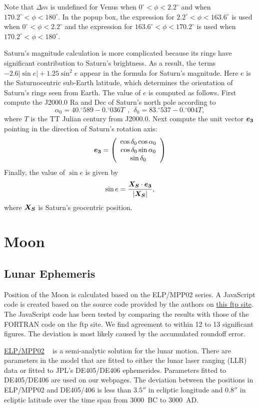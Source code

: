 \documentclass[12pt]{article}
\newcommand \beq {\begin{equation}}
\newcommand \eeq {\end{equation}}
\newcommand{\ve}[1]{\mbox{\boldmath $#1$}}
\begin{document}
Note that $\Delta m$ is undefined for Venus when $0^\circ < \phi < 2.2^\circ$ and 
when $170.2^\circ < \phi < 180^\circ$. In the popup box, the expression for 
$2.2^\circ < \phi < 163.6^\circ$ is used when $0^\circ < \phi < 2.2^\circ$ 
and the expression for $163.6^\circ < \phi < 170.2^\circ$ is used when 
$170.2^\circ < \phi < 180^\circ$.

Saturn's magnitude calculation is more complicated because its rings have 
significant contribution to Saturn's brightness. As a result, the terms 
$- 2.6 |\sin e| + 1.25\sin^2 e$ appear in the formula for Saturn's magnitude. 
Here $e$ is the Saturnocentric sub-Earth latitude, which determines the orientation 
of Saturn's rings seen from Earth. The value of $e$ is computed as follows.
First compute the J2000.0 Ra and Dec of Saturn's north pole according to 
\beq
  \alpha_0 = 40.^{\circ}589 - 0.^{\circ}036 T \ \ , \ \ 
  \delta_0 = 83.^{\circ}537 - 0.^{\circ}004 T ,
\eeq
where $T$ is the TT Julian century from J2000.0. Next compute the 
unit vector $\ve{e_3}$ pointing in the direction of Saturn's rotation axis:
\beq
\ve{e_3} = \left( \begin{array}{c} 
\cos \delta_0 \cos \alpha_0 \\ \cos \delta_0 \sin \alpha_0 \\ \sin \delta_0 
\end{array} \right) 
\label{eq:SaturnE3}
\eeq
Finally, the value of $\sin e$ is given by 
\beq
  \sin e = \frac{\ve{X_S}\cdot \ve{e_3}}{|\ve{X_S}|} ,
\eeq
where $\ve{X_S}$ is Saturn's geocentric position.

\section{Moon}

\subsection{Lunar Ephemeris}

Position of the Moon is calculated based on the ELP/MPP02 series. A JavaScript 
code is created based on the source code provided by the authors on 
\href{ftp://cyrano-se.obspm.fr/pub/2_lunar_solutions/2_elpmpp02/}{this ftp site}. 
The JavaScript code has been tested by comparing the results with those of the 
FORTRAN code on the ftp site. We find agreement to within 12 to 13 significant figures. 
The deviation is most likely caused by the accumulated roundoff error.

\href{http://adsabs.harvard.edu/abs/2003A%26A...404..735C}{ELP/MPP02} \
is a semi-analytic solution for the lunar motion. There are 
parameters in the model that are fitted to either the lunar 
laser ranging (LLR) data or fitted to JPL's DE405/DE406 ephemerides. 
Parameters fitted to DE405/DE406 are used on our webpages. The deviation between 
the positions in ELP/MPP02 and DE405/406 is less than $3.5''$ in ecliptic longitude 
and $0.8''$ in ecliptic latitude over the time span from 3000~BC to 3000~AD. 
\end{document}

